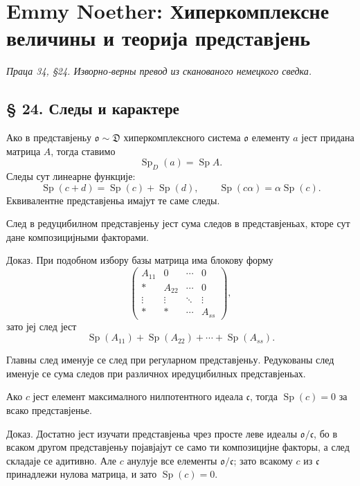 ﻿\documentclass[11pt]{article}
\providecommand{\mo}{\mathfrak{o}}
\providecommand{\mc}{\mathfrak{c}}
\begin{document}
\section*{Emmy Noether: Хиперкомплексне величины и теорија представјень}
\emph{Праца 34, §24. Изворно-верны превод из сканованого немецкого сведка.}

\subsection*{§ 24. Следы и карактере}

Ако в представјеньу $\mo\sim\mathfrak D$ хиперкомплексного система $\mo$ елементу $a$ јест придана матрица $A$, тогда ставимо
\[
        \operatorname{Sp}_{D}(a)=\operatorname{Sp} A.
\]
Следы сут линеарне функције:
\[
        \operatorname{Sp}(c+d)=\operatorname{Sp}(c)+\operatorname{Sp}(d),
        \qquad
        \operatorname{Sp}(c\alpha)=\alpha\operatorname{Sp}(c).
\]
Еквивалентне представјеньа имајут те саме следы.

След в редуцибилном представјеньу јест сума следов в представјеньах, кторе сут дане композицијными факторами.

Доказ. При подобном избору базы матрица има блокову форму
\[
        \begin{pmatrix}
        A_{11}&0&\cdots&0\\
        *&A_{22}&\cdots&0\\
        \vdots&\vdots&\ddots&\vdots\\
        *&*&\cdots&A_{ss}
        \end{pmatrix},
\]
зато јеј след јест
\[
        \operatorname{Sp}(A_{11})+\operatorname{Sp}(A_{22})+\cdots+\operatorname{Sp}(A_{ss}).
\]

Главны след именује се след при регуларном представјеньу. Редукованы след именује се сума следов при различнох иредуцибилных представјеньах.

Ако $c$ јест елемент максималного нилпотентного идеала $\mc$, тогда $\operatorname{Sp}(c)=0$ за всако представјенье.

Доказ. Достатно јест изучати представјеньа чрез просте леве идеалы $\mo/\mc$, бо в всаком другом представјеньу појавјајут се само ти композицијне факторы, а след складаје се адитивно. Але $c$ анулује все елементы $\mo/\mc$; зато всакому $c$ из $\mc$ принадлежи нулова матрица, и зато $\operatorname{Sp}(c)=0$.
\end{document}
